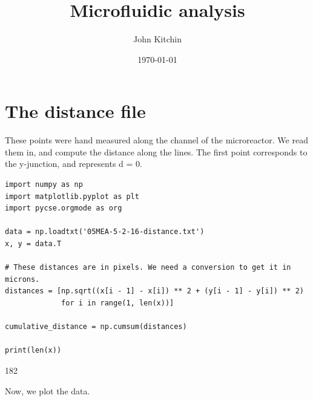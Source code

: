 \documentclass[11pt]{article}
\author{John Kitchin}
\date{\today}
\title{Microfluidic analysis}
\begin{document}
\tableofcontents


\section{The distance file}
\label{sec:orgheadline1}

These points were hand measured along the channel of the microreactor. We read them in, and compute the distance along the lines. The first point corresponds to the y-junction, and represents d = 0.

\begin{verbatim}
import numpy as np
import matplotlib.pyplot as plt
import pycse.orgmode as org

data = np.loadtxt('05MEA-5-2-16-distance.txt')
x, y = data.T

# These distances are in pixels. We need a conversion to get it in microns.
distances = [np.sqrt((x[i - 1] - x[i]) ** 2 + (y[i - 1] - y[i]) ** 2)
             for i in range(1, len(x))]

cumulative_distance = np.cumsum(distances)

print(len(x))
\end{verbatim}

182


Now, we plot the data.
\end{document}
